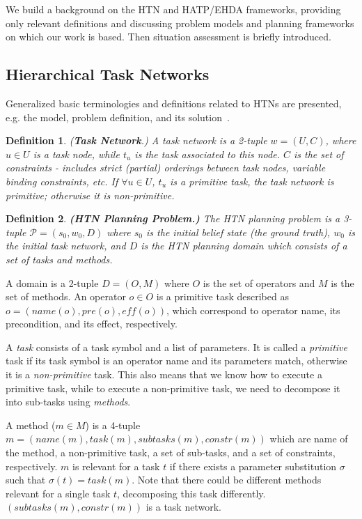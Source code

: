 \documentclass[letterpaper]{article} %
\newtheorem{definition}{Definition}
\begin{document}
We build a background on the HTN and HATP/EHDA frameworks, providing {only} relevant definitions and discussing problem models and planning frameworks on which our work is based. Then situation assessment is briefly introduced. 
\subsection{Hierarchical Task Networks}
Generalized basic terminologies and definitions related to HTNs are presented, e.g. the model, problem definition, and its solution~\cite{naubooks0014222}.  
\begin{definition} 
(\textbf{Task Network}.) {A task network is a 2-tuple $w=(U,C)$, where $u\in U$ is a task node, while $t_u$ is the task associated to this node. $C$ is the set of constraints - includes strict (partial) orderings between task nodes, variable binding constraints, etc. If $\forall u \in U$, $t_u$ is a primitive task, the task network is primitive; otherwise it is non-primitive.}  
\end{definition}

\begin{definition}
\textbf{(HTN Planning Problem.)} 
The HTN planning
problem is a 3-tuple $\mathcal{P} = (s_0, w_0, D)$ where $s_0$ is the initial belief state (the ground truth), $w_0$ is the initial task network, and $D$ is the HTN planning domain which consists of a set of tasks and methods.
\end{definition}
A domain is a 2-tuple $D=(O, M)$ where $O$ is the set of operators and $M$ is the set of methods. An operator $o \in O$ is a primitive task described as $o=(name(o), pre(o), \textit{eff}(o))$, which correspond to operator name, its precondition, and its effect, respectively. 

A \textit{task} consists of a task symbol and a list of parameters. It is called a \textit{primitive} task if its task symbol is an operator name and its parameters match, otherwise it is a \textit{non-primitive} task. This also means that we know how to execute a primitive task, while to execute a non-primitive task, we need to decompose it into sub-tasks using \textit{methods}. 

A method ($m \in M$) is a 4-tuple $m=(name(m),task(m),subtasks(m),constr(m))$ which are name of the method, a non-primitive task, a set of sub-tasks, and a set of constraints, respectively. $m$ is relevant for a task $t$ if there exists a parameter substitution $\sigma$ such that $\sigma(t) = task(m)$. Note that there could be different methods relevant for a single task $t$, decomposing this task differently. $(subtasks(m),constr(m))$ is a task network.      
\end{document}
